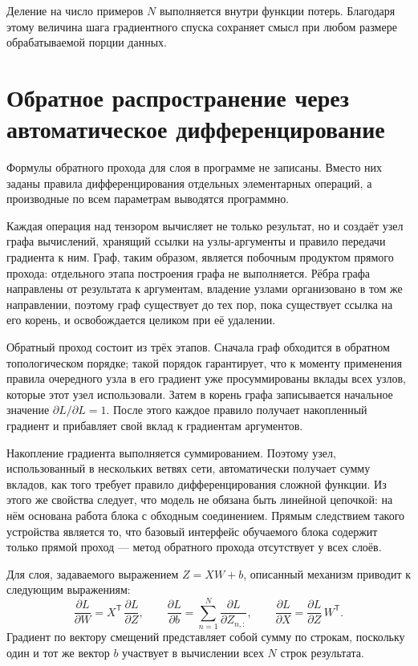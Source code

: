 Деление на число примеров $N$ выполняется внутри функции потерь.
Благодаря этому величина шага градиентного спуска сохраняет смысл при любом размере
обрабатываемой порции данных.

\section{Обратное распространение через автоматическое дифференцирование}

Формулы обратного прохода для слоя в программе не записаны. Вместо них заданы правила
дифференцирования отдельных элементарных операций, а производные по всем параметрам
выводятся программно.

Каждая операция над тензором вычисляет не только результат, но и создаёт узел графа
вычислений, хранящий ссылки на узлы-аргументы и правило передачи градиента к ним. Граф,
таким образом, является побочным продуктом прямого прохода: отдельного этапа построения
графа не выполняется. Рёбра графа направлены от результата к аргументам, владение узлами
организовано в том же направлении, поэтому граф существует до тех пор, пока существует
ссылка на его корень, и освобождается целиком при её удалении.

Обратный проход состоит из трёх этапов. Сначала граф обходится в обратном топологическом
порядке; такой порядок гарантирует, что к моменту применения правила очередного узла в
его градиент уже просуммированы вклады всех узлов, которые этот узел использовали. Затем
в корень графа записывается начальное значение $\partial L / \partial L = 1$. После этого
каждое правило получает накопленный градиент и прибавляет свой вклад к градиентам
аргументов.

Накопление градиента выполняется суммированием. Поэтому узел,
использованный в нескольких ветвях сети, автоматически получает сумму вкладов, как того
требует правило дифференцирования сложной функции. Из этого же свойства следует, что
модель не обязана быть линейной цепочкой: на нём основана работа блока с обходным
соединением. Прямым следствием такого устройства является то, что базовый интерфейс
обучаемого блока содержит только прямой проход --- метод обратного прохода отсутствует у
всех слоёв.

Для слоя, задаваемого выражением $Z = XW + b$, описанный механизм приводит к следующим
выражениям:
\begin{equation}
    \frac{\partial L}{\partial W} = X^{\mathsf{T}}\,\frac{\partial L}{\partial Z},
    \qquad
    \frac{\partial L}{\partial b} = \sum_{n=1}^{N} \frac{\partial L}{\partial Z_{n,:}},
    \qquad
    \frac{\partial L}{\partial X} = \frac{\partial L}{\partial Z}\,W^{\mathsf{T}}.
    \label{eq:dense-grad}
\end{equation}
Градиент по вектору смещений представляет собой сумму по строкам, поскольку один и тот же
вектор $b$ участвует в вычислении всех $N$ строк результата.

